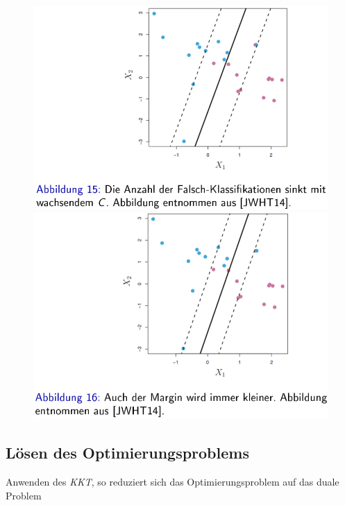 \documentclass{report}
\begin{document}
  \begin{figure}[H]	
    \centering	
    \begin{minipage}[b]{0.4\textwidth}	
      \includegraphics[scale=.265]{ml06_15}	
    \end{minipage}	
    \hfill	
    \begin{minipage}[b]{0.4\textwidth}	
      \includegraphics[scale=.275]{ml06_16}	
    \end{minipage}	
  \end{figure}	
  
  \subsection{Lösen des Optimierungsproblems}	
  Anwenden des \textit{KKT}, so reduziert sich das Optimierungsproblem auf das duale Problem	
  
\end{document}
